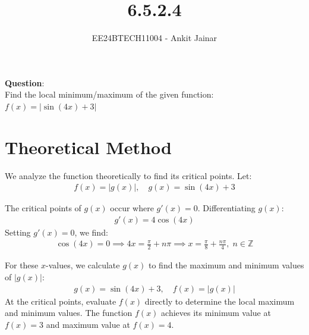 \documentclass[journal]{IEEEtran}
\begin{document}

\vspace{3cm}

\title{6.5.2.4}
\author{EE24BTECH11004 - Ankit Jainar}
\maketitle
{\let\newpage\relax\maketitle}

\renewcommand{\thefigure}{\theenumi}
\renewcommand{\thetable}{\theenumi}
\setlength{\intextsep}{10pt} %

\renewcommand{\thetable}{\theenumi}

\textbf{Question}:\\
Find the local minimum/maximum of the given function:\\
$f(x) = |\sin(4x) + 3|$
\\

\section*{Theoretical Method}
We analyze the function theoretically to find its critical points. Let:
\begin{align}
    f(x) = |g(x)|, \quad g(x) = \sin(4x) + 3
\end{align}

The critical points of \(g(x)\) occur where \(g'(x) = 0\). Differentiating \(g(x)\):
\begin{align}
    g'(x) = 4\cos(4x)
\end{align}
Setting \(g'(x) = 0\), we find:
\begin{align}
    \cos(4x) = 0 \implies 4x = \frac{\pi}{2} + n\pi \implies x = \frac{\pi}{8} + \frac{n\pi}{4}, \; n \in \mathbb{Z}
\end{align}

For these \(x\)-values, we calculate \(g(x)\) to find the maximum and minimum values of \(|g(x)|\):
\begin{align}
    g(x) = \sin(4x) + 3, \quad f(x) = |g(x)|
\end{align}
At the critical points, evaluate \(f(x)\) directly to determine the local maximum and minimum values. The function \(f(x)\) achieves its minimum value at \(f(x) = 3\) and maximum value at \(f(x) = 4\).
\end{document}
